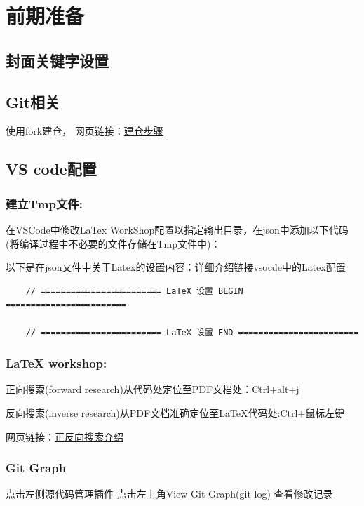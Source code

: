 \documentclass[engineeringmaster]{hquThesis}
\begin{document}
\makecover
% 
% 

\frontmatter{
    
    \tableofcontents
}

\mainmatter
\chapter{前期准备}
\section{封面关键字设置}
\section{Git相关}
使用fork建仓，
网页链接：\href{https://docs.github.com/en/repositories/creating-and-managing-repositories/creating-a-template-repository}{建仓步骤}

\section{VS code配置}
\subsection*{建立Tmp文件:}
在VSCode中修改LaTex WorkShop配置以指定输出目录，在json中添加以下代码(将编译过程中不必要的文件存储在Tmp文件中)：

以下是在json文件中关于Latex的设置内容：详细介绍链接\href{https://zhuanlan.zhihu.com/p/166523064}{vsocde中的Latex配置}
\begin{lstlisting}
    // ======================== LaTeX 设置 BEGIN  ========================

    // ======================== LaTeX 设置 END ========================
\end{lstlisting}

\subsection*{LaTeX workshop: }

正向搜索(forward research)从代码处定位至PDF文档处：Ctrl+alt+j

反向搜索(inverse research)从PDF文档准确定位至LaTeX代码处:Ctrl+鼠标左键

网页链接：\href{https://github.com/James-Yu/LaTeX-Workshop/wiki/View#synctex}{正反向搜索介绍}
\subsection*{Git Graph}
点击左侧源代码管理插件-点击左上角View Git Graph(git log)-查看修改记录
\end{document}
